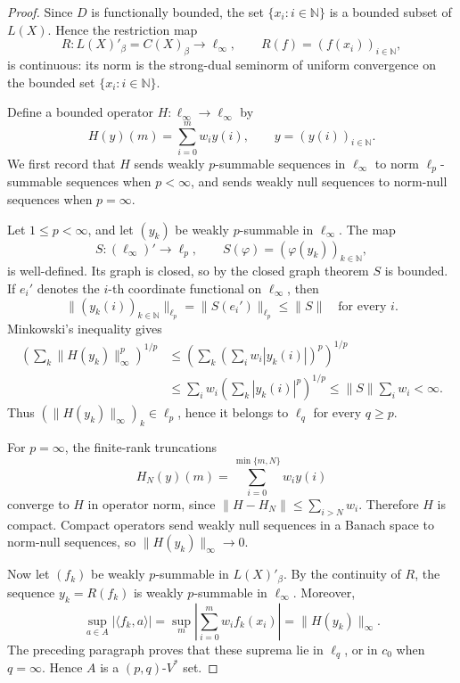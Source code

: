 \documentclass[11pt]{article}
\newcommand{\N}{\mathbb N}
\newcommand{\Vstar}{V^\ast}
\begin{document}
\begin{proof}
Since \(D\) is functionally bounded, the set \(\{x_i:i\in\N\}\) is a
bounded subset of \(L(X)\). Hence the restriction map
\[
  R:L(X)'_\beta=C(X)_\beta\longrightarrow \ell_\infty,\qquad
  R(f)=(f(x_i))_{i\in\N},
\]
is continuous: its norm is the strong-dual seminorm of uniform convergence
on the bounded set \(\{x_i:i\in\N\}\).

Define a bounded operator \(H:\ell_\infty\to\ell_\infty\) by
\[
  H(y)(m)=\sum_{i=0}^{m}w_i y(i),\qquad y=(y(i))_{i\in\N}.
\]
We first record that \(H\) sends weakly \(p\)-summable sequences in
\(\ell_\infty\) to norm \(\ell_p\)-summable sequences when \(p<\infty\),
and sends weakly null sequences to norm-null sequences when \(p=\infty\).

Let \(1\le p<\infty\), and let \((y_k)\) be weakly \(p\)-summable in
\(\ell_\infty\). The map
\[
  S:(\ell_\infty)'\to \ell_p,\qquad
  S(\varphi)=(\varphi(y_k))_{k\in\N},
\]
is well-defined. Its graph is closed, so by the closed graph theorem
\(S\) is bounded. If \(e_i'\) denotes the \(i\)-th coordinate functional
on \(\ell_\infty\), then
\[
  \big\|(y_k(i))_{k\in\N}\big\|_{\ell_p}
  =\|S(e_i')\|_{\ell_p}\le \|S\|
  \quad\text{for every }i.
\]
Minkowski's inequality gives
\[
\begin{aligned}
  \left(\sum_k \|H(y_k)\|_\infty^p\right)^{1/p}
  &\le
  \left(\sum_k \left(\sum_i w_i |y_k(i)|\right)^p\right)^{1/p}  \\
  &\le
  \sum_i w_i\left(\sum_k |y_k(i)|^p\right)^{1/p}
  \le \|S\|\sum_i w_i <\infty .
\end{aligned}
\]
Thus \((\|H(y_k)\|_\infty)_k\in\ell_p\), hence it belongs to
\(\ell_q\) for every \(q\ge p\).

For \(p=\infty\), the finite-rank truncations
\[
  H_N(y)(m)=\sum_{i=0}^{\min\{m,N\}} w_i y(i)
\]
converge to \(H\) in operator norm, since
\(\|H-H_N\|\le \sum_{i>N}w_i\). Therefore \(H\) is compact. Compact
operators send weakly null sequences in a Banach space to norm-null
sequences, so \(\|H(y_k)\|_\infty\to0\).

Now let \((f_k)\) be weakly \(p\)-summable in \(L(X)'_\beta\). By the
continuity of \(R\), the sequence \(y_k=R(f_k)\) is weakly \(p\)-summable
in \(\ell_\infty\). Moreover,
\[
  \sup_{a\in A}|\langle f_k,a\rangle|
  =
  \sup_m\left|\sum_{i=0}^{m}w_i f_k(x_i)\right|
  =\|H(y_k)\|_\infty .
\]
The preceding paragraph proves that these suprema lie in \(\ell_q\), or
in \(c_0\) when \(q=\infty\). Hence \(A\) is a
\((p,q)\)-\(\Vstar\) set.
\end{proof}
\end{document}
